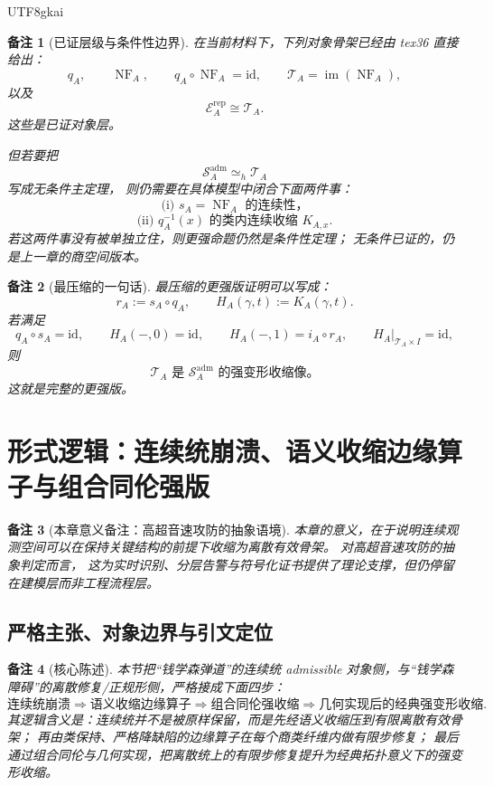 \documentclass[12pt]{article}
\newtheorem{remark}{备注}[section]
\newcommand{\id}{\mathrm{id}}
\begin{document}
\begin{CJK*}{UTF8}{gkai}
\begin{remark}[已证层级与条件性边界]
在当前材料下，下列对象骨架已经由 tex36 直接给出：
\[
  q_A,\qquad
  \operatorname{NF}_A,\qquad
  q_A\circ \operatorname{NF}_A=\id,\qquad
  \mathcal T_A=\operatorname{im}(\operatorname{NF}_A),
\]
以及
\[
  \mathcal E_A^{\mathrm{rep}}\cong \mathcal T_A.
\]
这些是已证对象层。

但若要把
\[
  \mathcal S_A^{\mathrm{adm}}\simeq_h \mathcal T_A
\]
写成无条件主定理，
则仍需要在具体模型中闭合下面两件事：
\[
  \text{(i) } s_A=\operatorname{NF}_A \text{ 的连续性，}
\]
\[
  \text{(ii) } q_A^{-1}(x) \text{ 的类内连续收缩 }K_{A,x}.
\]
若这两件事没有被单独立住，则更强命题仍然是条件性定理；
无条件已证的，仍是上一章的商空间版本。
\end{remark}

\begin{remark}[最压缩的一句话]
最压缩的更强版证明可以写成：
\[
  \boxed{
    r_A:=s_A\circ q_A,\qquad
    H_A(\gamma,t):=K_A(\gamma,t).
  }
\]
若满足
\[
  q_A\circ s_A=\id,\qquad
  H_A(-,0)=\id,\qquad
  H_A(-,1)=i_A\circ r_A,\qquad
  H_A|_{\mathcal T_A\times I}=\id,
\]
则
\[
  \boxed{
    \mathcal T_A \text{ 是 } \mathcal S_A^{\mathrm{adm}} \text{ 的强变形收缩像。}
  }
\]
这就是完整的更强版。
\end{remark}

\clearpage
\section{形式逻辑：连续统崩溃、语义收缩边缘算子与组合同伦强版}
\label{sec:tex1-ch9}

\begin{remark}[本章意义备注：高超音速攻防的抽象语境]
本章的意义，在于说明连续观测空间可以在保持关键结构的前提下收缩为离散有效骨架。
对高超音速攻防的抽象判定而言，
这为实时识别、分层告警与符号化证书提供了理论支撑，但仍停留在建模层而非工程流程层。
\end{remark}

\subsection{严格主张、对象边界与引文定位}
\label{subsec:tex1-ch9-claim}

\begin{remark}[核心陈述]
本节把“钱学森弹道”的连续统 admissible 对象侧，与“钱学森障碍”的离散修复/正规形侧，严格接成下面四步：
\[
  \text{连续统崩溃}
  \Longrightarrow
  \text{语义收缩边缘算子}
  \Longrightarrow
  \text{组合同伦强收缩}
  \Longrightarrow
  \text{几何实现后的经典强变形收缩}.
\]
其逻辑含义是：连续统并不是被原样保留，而是先经语义收缩压到有限离散有效骨架；
再由类保持、严格降缺陷的边缘算子在每个商类纤维内做有限步修复；
最后通过组合同伦与几何实现，把离散统上的有限步修复提升为经典拓扑意义下的强变形收缩。
\end{remark}


\end{CJK*}
\end{document}
